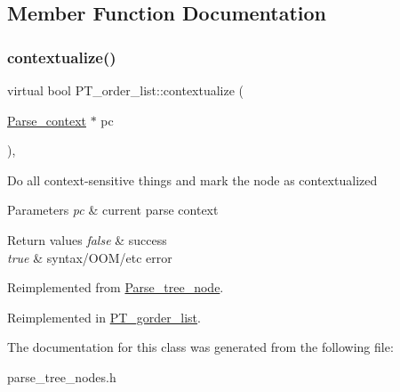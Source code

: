 \subsection{Member Function Documentation}
\mbox{\label{classPT__order__list_a04039b92b0e1bd5d37f1975459e7b9b6}} 
\subsubsection{\texorpdfstring{contextualize()}{contextualize()}}
{\footnotesize\ttfamily virtual bool P\+T\+\_\+order\+\_\+list\+::contextualize (\begin{DoxyParamCaption}\item[{\mbox{\hyperlink{structParse__context}{Parse\+\_\+context}} $\ast$}]{pc }\end{DoxyParamCaption})\hspace{0.3cm}{\ttfamily [inline]}, {\ttfamily [virtual]}}

Do all context-\/sensitive things and mark the node as contextualized


\begin{DoxyParams}{Parameters}
{\em pc} & current parse context\\
\hline
\end{DoxyParams}

\begin{DoxyRetVals}{Return values}
{\em false} & success \\
\hline
{\em true} & syntax/\+O\+O\+M/etc error \\
\hline
\end{DoxyRetVals}


Reimplemented from \mbox{\hyperlink{classParse__tree__node_a22d93524a537d0df652d7efa144f23da}{Parse\+\_\+tree\+\_\+node}}.



Reimplemented in \mbox{\hyperlink{classPT__gorder__list_aee895e7250e73f670eccd71704b0c027}{P\+T\+\_\+gorder\+\_\+list}}.



The documentation for this class was generated from the following file\+:\begin{DoxyCompactItemize}
\item 
parse\+\_\+tree\+\_\+nodes.\+h\end{DoxyCompactItemize}
